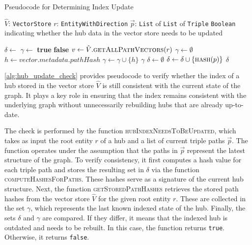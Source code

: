 \begin{algorithm}
\caption{Pseudocode for Determining Index Update}
\label{alg:hub_update_check}
\begin{algorithmic}[1]
\PersistentState
    \Statex $\hat{V}$: \texttt{VectorStore} 
\Require 
    \Statex $r$: \texttt{EntityWithDirection} 
    \Statex $\vec{p}$: \texttt{List} of \texttt{List} of \texttt{Triple} 
\Ensure
    \Statex \texttt{Boolean} indicating whether the hub data in the vector store needs to be updated

\Statex
{}
    \State $\delta \gets$ 
    \State $\gamma \gets$ 
    \If{$\delta \neq \gamma$}
        \State \Return \textbf{true}
    \Else
        \State \Return \textbf{false}
    \EndIf
\EndFunction
\Statex
{}
    \State $v \gets \hat{V}.\Call{getAllPathVectors}{r}$
    \State $\gamma \gets \emptyset$
        \State $h \gets vector.metadata.pathHash$
        \State $\gamma \gets \gamma \cup \{h\}$
    \EndFor
    \State \Return $\gamma$
\EndFunction
\Statex
{}
    \State $\delta \gets \emptyset$
        \State $\delta \gets \delta \cup \{\Call{hash}{p}\}$
    \EndFor
    \State \Return $\delta$
\EndFunction
\end{algorithmic}
\end{algorithm}

\autoref{alg:hub_update_check} provides pseudocode to verify whether the index of a hub stored in the vector store \(\hat{V}\) is still consistent with the current state of the graph. It plays a key role in ensuring that the index remains consistent with the underlying graph without unnecessarily rebuilding hubs that are already up-to-date. 

The check is performed by the function \textsc{hubIndexNeedsToBeUpdated}, which takes as input the root entity \(r\) of a hub and a list of current triple paths \(\vec{p}\). The function operates under the assumption that the paths in \(\vec{p}\) represent the latest structure of the graph. To verify consistency, it first computes a hash value for each triple path and stores the resulting set in \(\delta\) via the function \textsc{computeHashesForPaths}. These hashes serve as a signature of the current hub structure. Next, the function \textsc{getStoredPathHashes} retrieves the stored path hashes from the vector store \(\hat{V}\) for the given root entity \(r\). These are collected in the set \(\gamma\), which represents the last known indexed state of the hub. Finally, the sets \(\delta\) and \(\gamma\) are compared. If they differ, it means that the indexed hub is outdated and needs to be rebuilt. In this case, the function returns \texttt{true}. Otherwise, it returns \texttt{false}.

